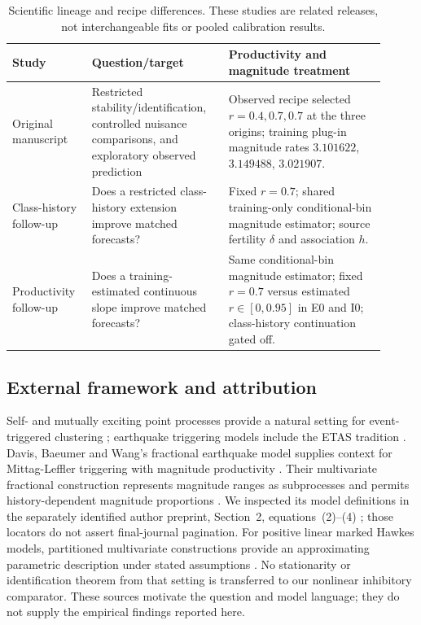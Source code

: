 \begin{table}[tbp]
\centering\small
\caption{Scientific lineage and recipe differences. These studies are
related releases, not interchangeable fits or pooled calibration results.}
\label{a2:recipe}
\begin{tabular}{>{\raggedright\arraybackslash}p{0.18\linewidth}>{\raggedright\arraybackslash}p{0.34\linewidth}>{\raggedright\arraybackslash}p{0.39\linewidth}}
\toprule
Study & Question/target & Productivity and magnitude treatment\\
\midrule
Original manuscript &
Restricted stability/identification, controlled nuisance comparisons,
and exploratory observed prediction &
Observed recipe selected \(r=0.4,0.7,0.7\) at the three origins;
training plug-in magnitude rates \(3.101622\), \(3.149488\), \(3.021907\).\\
Class-history follow-up &
Does a restricted class-history extension improve matched forecasts? &
Fixed \(r=0.7\); shared training-only conditional-bin magnitude
estimator; source fertility \(\delta\) and association \(h\).\\
Productivity follow-up &
Does a training-estimated continuous slope improve matched forecasts? &
Same conditional-bin magnitude estimator;
fixed \(r=0.7\) versus estimated \(r\in[0,0.95]\) in E0 and I0;
class-history continuation gated off.\\
\bottomrule
\end{tabular}
\end{table}


\subsection{External framework and attribution}

Self- and mutually exciting point processes provide a natural setting for
event-triggered clustering \citep{Hawkes1971}; earthquake triggering models
include the ETAS tradition \citep{Ogata1988}. Davis, Baeumer and Wang's
fractional earthquake model supplies context for Mittag-Leffler triggering
with magnitude productivity \citep{DavisBaeumerWang2024}. Their multivariate
fractional construction represents magnitude ranges as subprocesses and
permits history-dependent magnitude proportions
\citep{DavisBaeumerWang2026}. We inspected its model definitions in the
separately identified author preprint, Section~2, equations~(2)--(4)
\citep{DavisBaeumerWangPreprint2024}; those locators do not assert final-journal
pagination. For positive linear marked Hawkes models, partitioned multivariate
constructions provide an approximating parametric description under stated
assumptions \citep{DavisKresinBaeumerWang2026}. No stationarity or
identification theorem from that setting is transferred to our nonlinear
inhibitory comparator. These sources motivate the question and
model language; they do not supply the empirical findings reported here.

